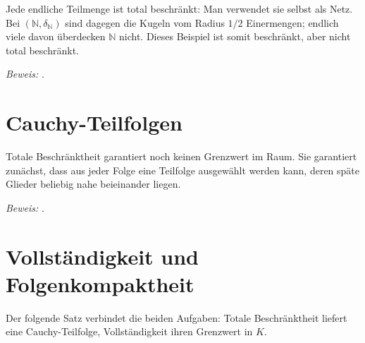 Jede endliche Teilmenge ist total beschränkt: Man verwendet sie selbst als
Netz. Bei \((\mathbb N,\delta_{\mathbb N})\) sind dagegen die Kugeln vom
Radius \(1/2\) Einermengen; endlich viele davon überdecken \(\mathbb N\)
nicht. Dieses Beispiel ist somit beschränkt, aber nicht total beschränkt.

\noindent\emph{Beweis:} .

\section{Cauchy-Teilfolgen}

Totale Beschränktheit garantiert noch keinen Grenzwert im Raum. Sie
garantiert zunächst, dass aus jeder Folge eine Teilfolge ausgewählt werden
kann, deren späte Glieder beliebig nahe beieinander liegen.

\noindent\emph{Beweis:} .

\section{Vollständigkeit und Folgenkompaktheit}

Der folgende Satz verbindet die beiden Aufgaben: Totale Beschränktheit
liefert eine Cauchy-Teilfolge, Vollständigkeit ihren Grenzwert in \(K\).

